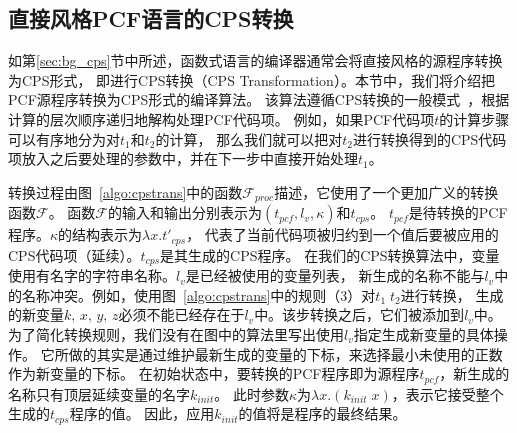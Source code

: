 \subsection{直接风格PCF语言的CPS转换} \label{sec:cpstrans}

如第\ref{sec:bg_cps}节中所述，函数式语言的编译器通常会将直接风格的源程序转换为CPS形式，
即进行CPS转换（CPS Transformation）。本节中，我们将介绍把PCF源程序转换为CPS形式的编译算法。
该算法遵循CPS转换的一般模式~\cite{plotkin1975call,danvy2007one}，根据计算的层次顺序递归地解构处理PCF代码项。
例如，如果PCF代码项$t$的计算步骤可以有序地分为对$t_1$和$t_2$的计算，
那么我们就可以把对$t_2$进行转换得到的CPS代码项放入之后要处理的参数中，并在下一步中直接开始处理$t_1$。 

转换过程由图~\ref{algo:cpstrans}中的函数$\mathcal{F}_{proc}$描述，它使用了一个更加广义的转换函数$\mathcal{F}$。
函数$\mathcal{F}$的输入和输出分别表示为$(t_{pcf}, l_v, \kappa)$和$t_{cps}$。
$t_{pcf}$是待转换的PCF程序。$\kappa$的结构表示为$\lambda x. t'_{cps}$，
代表了当前代码项被归约到一个值后要被应用的CPS代码项（延续）。$t_{cps}$是其生成的CPS程序。
在我们的CPS转换算法中，变量使用有名字的字符串名称。$l_v$是已经被使用的变量列表，
新生成的名称不能与$l_v$中的名称冲突。例如，使用图~\ref{algo:cpstrans}中的规则（3）对$t_1\; t_2$进行转换，
生成的新变量$k,\, x,\, y,\, z$必须不能已经存在于$l_v$中。该步转换之后，它们被添加到$l_v$中。
为了简化转换规则，我们没有在图中的算法里写出使用$l_v$指定生成新变量的具体操作。
它所做的其实是通过维护最新生成的变量的下标，来选择最小未使用的正数作为新变量的下标。
在初始状态中，要转换的PCF程序即为源程序$t_{pcf}$，新生成的名称只有顶层延续变量的名字$k_{init}$。
此时参数$\kappa$为$\lambda x. (k_{init}\; x)$，表示它接受整个生成的$t_{cps}$程序的值。
因此，应用$k_{init}$的值将是程序的最终结果。


